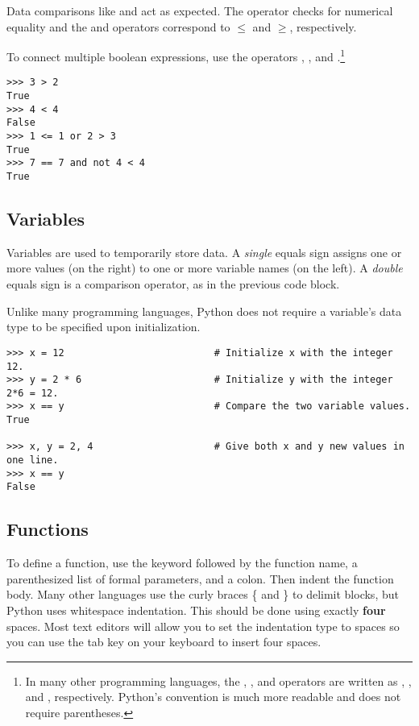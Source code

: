 Data comparisons like \li{<} and \li{>} act as expected.
The \li{==} operator checks for numerical equality and the \li{<=} and \li{>=} operators correspond to $\le$ and $\ge$, respectively.

To connect multiple boolean expressions, use the operators , , and .\footnote{In many other programming languages, the , , and  operators are written as \li{&&}, \li{||}, and \li{!}, respectively. Python's convention is much more readable and does not require parentheses.}

\begin{lstlisting}
>>> 3 > 2
True
>>> 4 < 4
False
>>> 1 <= 1 or 2 > 3
True
>>> 7 == 7 and not 4 < 4
True
\end{lstlisting}

\subsection*{Variables} %

Variables are used to temporarily store data.
A \emph{single} equals sign assigns one or more values (on the right) to one or more variable names (on the left).
A \emph{double} equals sign is a comparison operator, as in the previous code block.

Unlike many programming languages, Python does not require a variable's data type to be specified upon initialization.

\begin{lstlisting}
>>> x = 12                          # Initialize x with the integer 12.
>>> y = 2 * 6                       # Initialize y with the integer 2*6 = 12.
>>> x == y                          # Compare the two variable values.
True

>>> x, y = 2, 4                     # Give both x and y new values in one line.
>>> x == y
False
\end{lstlisting}

\subsection*{Functions} %

To define a function, use the  keyword followed by the function name, a parenthesized list of formal parameters, and a colon.
Then indent the function body.
Many other languages use the curly braces \{ and \} to delimit blocks, but Python uses whitespace indentation.
This should be done using exactly \textbf{four} spaces.
Most text editors will allow you to set the indentation type to spaces so you can use the tab key on your keyboard to insert four spaces.

